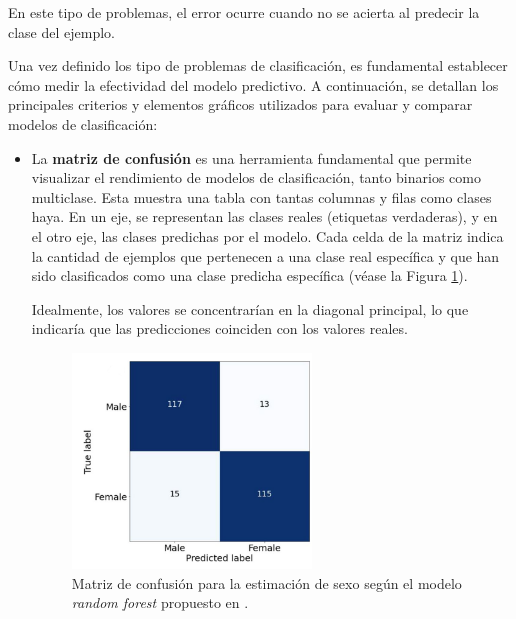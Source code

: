 En este tipo de problemas, el error ocurre cuando no se acierta al predecir la clase del ejemplo.



Una vez definido los tipo de problemas de clasificación, es fundamental establecer cómo medir la efectividad del 
modelo predictivo. A continuación, se detallan los principales criterios y elementos gráficos utilizados para 
evaluar y comparar modelos de clasificación:

\begin{itemize}
    
    \item La \textbf{matriz de confusión} es una herramienta fundamental que permite visualizar el rendimiento de 
    modelos de clasificación, tanto binarios como multiclase.
    Esta muestra una tabla con tantas columnas y filas como clases haya. En un eje, se representan las 
    clases reales (etiquetas verdaderas), y en el otro eje, las clases predichas por el modelo.
    Cada celda de la matriz indica la cantidad de ejemplos que pertenecen a una clase real específica y que han 
    sido clasificados como una clase predicha específica (véase la Figura \ref{fig:conf_matrix_binary}).

    Idealmente, los valores se concentrarían en la diagonal principal, lo que indicaría que las predicciones 
    coinciden con los valores reales.

    \begin{figure}[h]
        \centering
        \includegraphics[width=0.6\textwidth]{capitulos/cap_02/imagenes/confusion_matrix_binary.png}
        \caption{Matriz de confusión para la estimación de sexo según el modelo \textit{random forest} propuesto 
                 en \cite{bidmos2023}.} 
        \label{fig:conf_matrix_binary}
    \end{figure}


\end{itemize}
